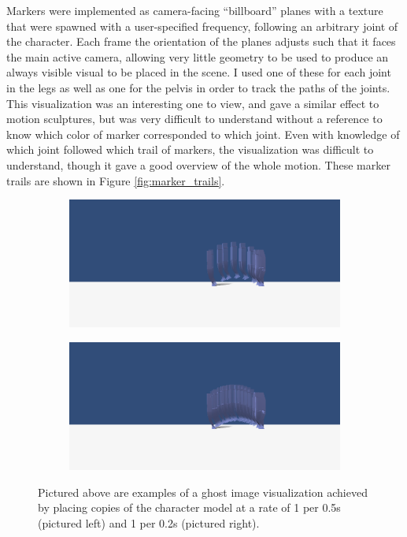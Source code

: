 Markers were implemented as camera-facing ``billboard'' planes with a texture that were spawned with a user-specified frequency, following an arbitrary joint of the character.  Each frame the orientation of the planes adjusts such that it faces the main active camera, allowing very little geometry to be used to produce an always visible visual to be placed in the scene.  I used one of these for each joint in the legs as well as one for the pelvis in order to track the paths of the joints.  This visualization was an interesting one to view, and gave a similar effect to motion sculptures, but was very difficult to understand without a reference to know which color of marker corresponded to which joint.  Even with knowledge of which joint followed which trail of markers, the visualization was difficult to understand, though it gave a good overview of the whole motion.  These marker trails are shown in Figure \ref{fig:marker_trails}.

\begin{figure}[ht]
	\centering
	\begin{subfigure}[b]{0.49\textwidth}
		\includegraphics[width=\textwidth]{images/ghosts/side-sparse.png}
	\end{subfigure}
	\begin{subfigure}[b]{0.49\textwidth}
		\includegraphics[width=\textwidth]{images/ghosts/side-dense.png}
	\end{subfigure}
	\caption[Ghost image visualization]{Pictured above are examples of a ghost image visualization achieved by placing copies of the character model at a rate of 1 per 0.5s (pictured left) and 1 per 0.2s (pictured right).}
	\label{fig:ghost_vis}
\end{figure}


